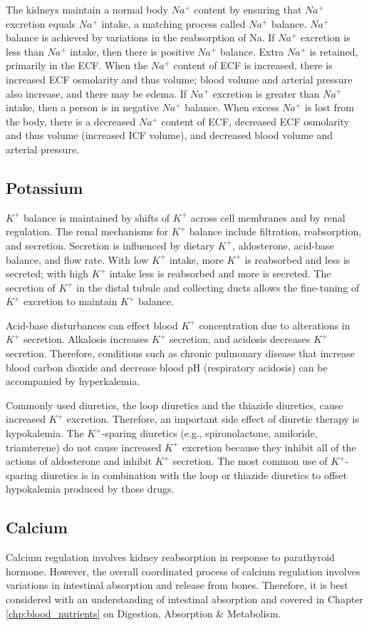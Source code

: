 The kidneys maintain a normal body $Na^+$ content by ensuring that $Na^+$ excretion equals $Na^+$ intake, a matching process called $Na^+$ balance. $Na^+$ balance is achieved by variations in the reabsorption of Na.  If $Na^+$ excretion is less than $Na^+$ intake, then there is positive $Na^+$ balance. Extra $Na^+$ is retained, primarily in the ECF. When the $Na^+$ content of ECF is increased, there is increased ECF osmolarity and thus volume; blood volume and arterial pressure also increase, and there may be edema. If $Na^+$ excretion is greater than $Na^+$ intake, then a person is in negative $Na^+$ balance. When excess $Na^+$ is lost from the body, there is a decreased $Na^+$ content of ECF, decreased ECF osmolarity and thus volume (increased ICF volume), and decreased blood volume and arterial pressure. 


\subsection{Potassium}
$K^+$ balance is maintained by shifts of $K^+$ across cell membranes and by renal regulation. The renal mechanisms for $K^+$ balance include filtration, reabsorption, and secretion. Secretion is influenced by dietary $K^+$, aldosterone, acid-base balance, and flow rate. With low $K^+$ intake, more $K^+$ is reabsorbed and less is secreted; with high $K^+$ intake less is reabsorbed and more is secreted. The secretion of  $K^+$ in the distal tubule and collecting ducts allows the fine-tuning of $K^+$ excretion to maintain $K^+$ balance.

Acid-base disturbances can effect blood $K^+$ concentration due to alterations in $K^+$ secretion. Alkalosis increases $K^+$ secretion, and acidosis decreases $K^+$ secretion. Therefore, conditions such as chronic pulmonary disease that increase blood carbon dioxide and decrease blood pH (respiratory acidosis) can be accompanied by hyperkalemia. 

Commonly used diuretics, the loop diuretics and the thiazide diuretics, cause increased $K^+$ excretion. Therefore, an important side effect of diuretic therapy is hypokalemia. The $K^+$-sparing diuretics (e.g., spironolactone, amiloride, triamterene) do not cause increased $K^+$ excretion because they inhibit all of the actions of aldosterone and inhibit $K^+$ secretion. The most common use of $K^+$-sparing diuretics is in combination with the loop or thiazide diuretics to offset hypokalemia produced by those drugs. 

\subsection{Calcium}
Calcium regulation involves kidney reabsorption in response to parathyroid hormone. However, the overall coordinated process of calcium regulation involves variations in intestinal absorption and release from bones. Therefore, it is best considered with an understanding of intestinal absorption and covered in Chapter \ref{chp:blood_nutrients} on Digestion, Absorption \& Metabolism.

